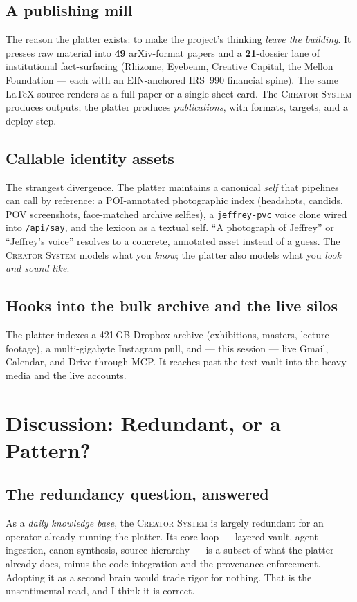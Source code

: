 \documentclass[10pt,letterpaper,twocolumn]{article}
\newcommand{\cs}{\textsc{Creator System}}
\begin{document}
\subsection{A publishing mill}
The reason the platter exists: to make the project's thinking \emph{leave the building}. It presses raw material into \textbf{49} arXiv-format papers and a \textbf{21}-dossier lane of institutional fact-surfacing (Rhizome, Eyebeam, Creative Capital, the Mellon Foundation --- each with an EIN-anchored IRS~990 financial spine). The same \LaTeX{} source renders as a full paper or a single-sheet card. The \cs{} produces outputs; the platter produces \emph{publications}, with formats, targets, and a deploy step.

\subsection{Callable identity assets}
The strangest divergence. The platter maintains a canonical \emph{self} that pipelines can call by reference: a POI-annotated photographic index (headshots, candids, POV screenshots, face-matched archive selfies), a \texttt{jeffrey-pvc} voice clone wired into \texttt{/api/say}, and the lexicon as a textual self. ``A photograph of Jeffrey'' or ``Jeffrey's voice'' resolves to a concrete, annotated asset instead of a guess. The \cs{} models what you \emph{know}; the platter also models what you \emph{look and sound like}.

\subsection{Hooks into the bulk archive and the live silos}
The platter indexes a 421\,GB Dropbox archive (exhibitions, masters, lecture footage), a multi-gigabyte Instagram pull, and --- this session --- live Gmail, Calendar, and Drive through MCP. It reaches past the text vault into the heavy media and the live accounts.


\section{Discussion: Redundant, or a Pattern?}
\label{sec:discussion}

\subsection{The redundancy question, answered}
As a \emph{daily knowledge base}, the \cs{} is largely redundant for an operator already running the platter. Its core loop --- layered vault, agent ingestion, canon synthesis, source hierarchy --- is a subset of what the platter already does, minus the code-integration and the provenance enforcement. Adopting it as a second brain would trade rigor for nothing. That is the unsentimental read, and I think it is correct.
\end{document}

